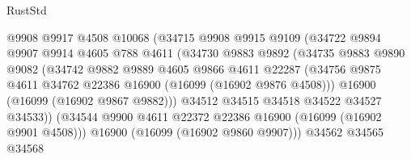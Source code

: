 \begin{lexlean}{RustStd}
\begin{coremodule}
                                @9908
                                @9917
                                @4508
                                @10068
                                (@34715
                                  @9908
                                  @9915
                                  @9109
                                  (@34722
                                    @9894
                                    @9907
                                    @9914
                                    @4605
                                    @788
                                    @4611
                                    (@34730
                                      @9883
                                      @9892
                                      (@34735
                                        @9883
                                        @9890
                                        @9082
                                        (@34742
                                          @9882
                                          @9889
                                          @4605
                                          @9866
                                          @4611
                                          @22287
                                          (@34756
                                            @9875
                                            @4611
                                            @34762
                                            @22386
                                            @16900
                                            (@16099 (@16902 @9876 @4508)))
                                          @16900
                                          (@16099 (@16902 @9867 @9882)))
                                        @34512
                                        @34515
                                        @34518
                                        @34522
                                        @34527
                                        @34533))
                                    (@34544
                                      @9900
                                      @4611
                                      @22372
                                      @22386
                                      @16900
                                      (@16099 (@16902 @9901 @4508)))
                                    @16900
                                    (@16099 (@16902 @9860 @9907)))
                                  @34562
                                  @34565
                                  @34568

\end{coremodule}
\end{lexlean}
